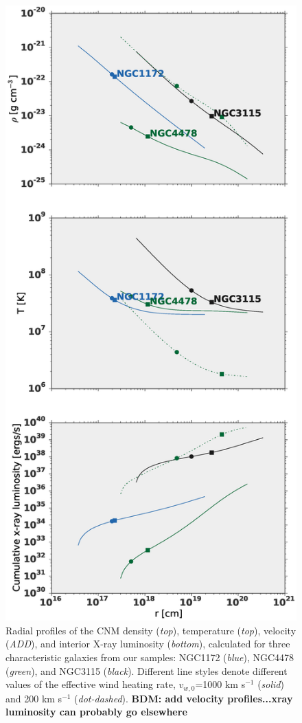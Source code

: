 \documentclass[usenatbib,fleqn]{mn2e}
\begin{document}

\begin{figure}
  \includegraphics[width=\columnwidth]{profiles.eps}
  \caption{\label{fig:profiles}Radial profiles of the CNM density ({\it top}), temperature ({\it top}), velocity ({\it ADD}), and interior X-ray luminosity ({\it bottom}), calculated for three characteristic galaxies from our samples: NGC1172 ({\it blue}), NGC4478 ({\it green}), and NGC3115 ({\it black}).  Different line styles denote different values of the effective wind heating rate, $v_{w,0}$=1000 km s$^{-1}$ ({\it solid}) and 200 km s$^{-1}$ ({\it dot-dashed}).   {\bf BDM: add velocity profiles...xray luminosity can probably go elsewhere}}
\end{figure}
\end{document}
